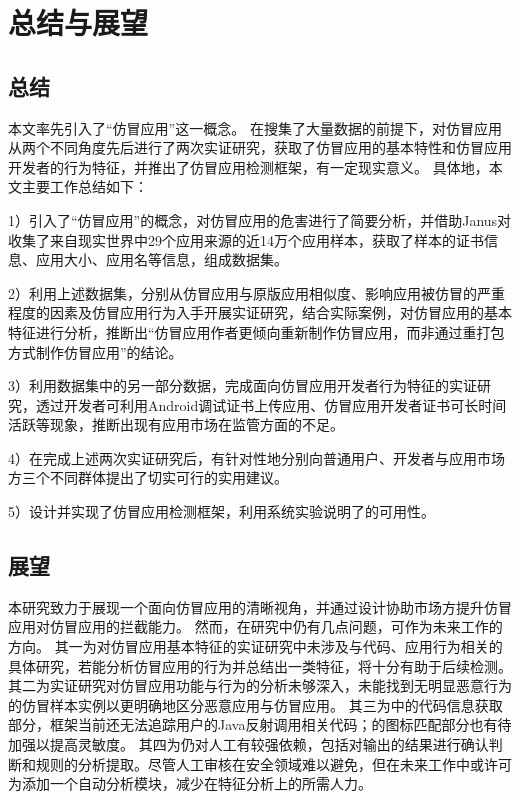 \chapter{总结与展望}
\label{chp:future}

\section{总结}
本文率先引入了``仿冒应用''这一概念。
在搜集了大量数据的前提下，对仿冒应用从两个不同角度先后进行了两次实证研究，获取了仿冒应用的基本特性和仿冒应用开发者的行为特征，并推出了仿冒应用检测框架\mytool ，有一定现实意义。
具体地，本文主要工作总结如下：

1）引入了``仿冒应用''的概念，对仿冒应用的危害进行了简要分析，并借助Janus对收集了来自现实世界中29个应用来源的近14万个应用样本，获取了样本的证书信息、应用大小、应用名等信息，组成数据集。

2）利用上述数据集，分别从仿冒应用与原版应用相似度、影响应用被仿冒的严重程度的因素及仿冒应用行为入手开展实证研究，结合实际案例，对仿冒应用的基本特征进行分析，推断出``仿冒应用作者更倾向重新制作仿冒应用，而非通过重打包方式制作仿冒应用''的结论。

3）利用数据集中的另一部分数据，完成面向仿冒应用开发者行为特征的实证研究，透过开发者可利用Android调试证书上传应用、仿冒应用开发者证书可长时间活跃等现象，推断出现有应用市场在监管方面的不足。

4）在完成上述两次实证研究后，有针对性地分别向普通用户、开发者与应用市场方三个不同群体提出了切实可行的实用建议。

5）设计并实现了仿冒应用检测框架\mytool ，利用系统实验说明了\mytool 的可用性。


\section{展望}

本研究致力于展现一个面向仿冒应用的清晰视角，并通过设计\mytool 协助市场方提升仿冒应用对仿冒应用的拦截能力。
然而，在研究中仍有几点问题，可作为未来工作的方向。
其一为对仿冒应用基本特征的实证研究中未涉及与代码、应用行为相关的具体研究，若能分析仿冒应用的行为并总结出一类特征，将十分有助于后续检测。
其二为实证研究对仿冒应用功能与行为的分析未够深入，未能找到无明显恶意行为的仿冒样本实例以更明确地区分恶意应用与仿冒应用。
其三为\mytool 中\componentB 的代码信息获取部分，框架当前还无法追踪用户的Java反射调用相关代码；\mytool 的图标匹配部分也有待加强以提高灵敏度。
其四为\mytool 仍对人工有较强依赖，包括对输出的结果进行确认判断和规则的分析提取。尽管人工审核在安全领域难以避免，但在未来工作中或许可为\mytool 添加一个自动分析模块，减少在特征分析上的所需人力。
